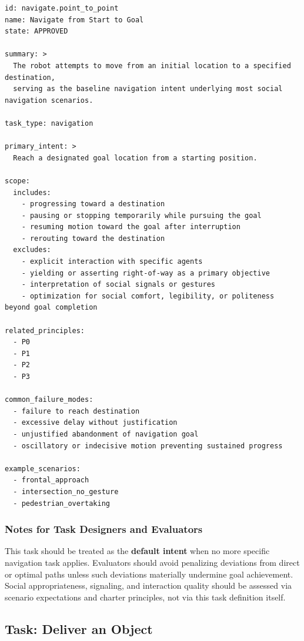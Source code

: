 \documentclass[utf8]{frontiers_suppmat} %
\begin{document}
\begin{lstlisting}[style=literatecard]
id: navigate.point_to_point
name: Navigate from Start to Goal
state: APPROVED

summary: >
  The robot attempts to move from an initial location to a specified destination,
  serving as the baseline navigation intent underlying most social navigation scenarios.

task_type: navigation

primary_intent: >
  Reach a designated goal location from a starting position.

scope:
  includes:
    - progressing toward a destination
    - pausing or stopping temporarily while pursuing the goal
    - resuming motion toward the goal after interruption
    - rerouting toward the destination
  excludes:
    - explicit interaction with specific agents
    - yielding or asserting right-of-way as a primary objective
    - interpretation of social signals or gestures
    - optimization for social comfort, legibility, or politeness beyond goal completion

related_principles:
  - P0
  - P1
  - P2
  - P3

common_failure_modes:
  - failure to reach destination
  - excessive delay without justification
  - unjustified abandonment of navigation goal
  - oscillatory or indecisive motion preventing sustained progress

example_scenarios:
  - frontal_approach
  - intersection_no_gesture
  - pedestrian_overtaking
\end{lstlisting}

\subsubsection{Notes for Task Designers and
Evaluators}\label{notes-for-task-designers-and-evaluators}

This task should be treated as the \textbf{default intent} when no more
specific navigation task applies. Evaluators should avoid penalizing
deviations from direct or optimal paths unless such deviations
materially undermine goal achievement. Social appropriateness,
signaling, and interaction quality should be assessed via scenario
expectations and charter principles, not via this task definition
itself.


\subsection{Task: Deliver an Object}\label{task-deliver-an-object}
\end{document}

